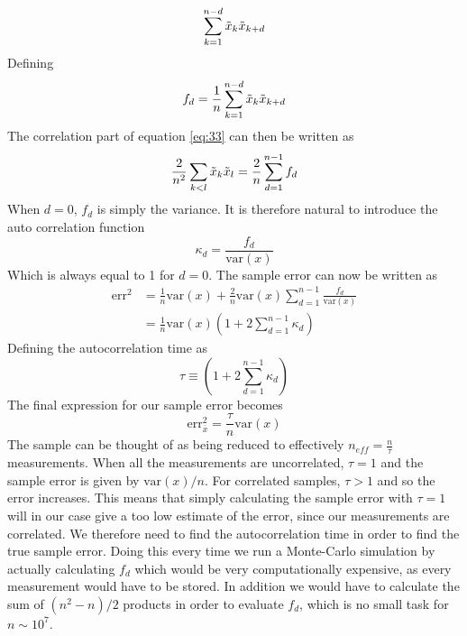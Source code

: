 \documentclass[
    a4paper, aps, twocolumn, floatfix, superscriptaddress,
    nofootinbib]{revtex4-1}
\begin{document}
\begin{equation}
     \sum_{k=1}^{n-d}\Tilde{x}_k \Tilde{x}_{k+d}
\end{equation}
Defining 
\begin{equation}
    f_d = \frac{1}{n} \sum_{k=1}^{n-d} \Tilde{x}_k \Tilde{x}_{k+d}
\end{equation}
The correlation part of equation \eqref{eq:33} can then be written as 
\begin{equation}
 \frac{2}{n^2} \sum_{k<l} \Tilde{x}_k \Tilde{x}_l = \frac{2}{n} \sum_{d=1}^{n-1} f_d   
\end{equation}
When $d=0$, $f_d$ is simply the variance. It is therefore natural to introduce the auto correlation function
\begin{equation}
\kappa_d = \frac{f_d}{\text{var}(x)}
\end{equation}
Which is always equal to 1 for $d=0$. The sample error can now be written as 
\begin{align}
    \text{err}^2 &= \frac{1}{n}\text{var}(x) + \frac{2}{n} \text{var}(x) \sum_{d=1}^{n-1} \frac{f_d}{\text{var}(x)}\\ 
    & = \frac{1}{n} \text{var}(x) \left( 1 + 2\sum_{d=1}^{n-1} \kappa_d \right) 
\end{align}
Defining the autocorrelation time as 
\begin{equation}
\tau \equiv \left( 1 + 2\sum_{d=1}^{n-1} \kappa_d \right) 
\end{equation}
The final expression for our sample error becomes 
\begin{equation}\label{eq:43}
    \text{err}_{\overline{x}}^2 = \frac{\tau}{n}\text{var}(x)
\end{equation}
The sample can be thought of as being reduced to effectively $n_{eff} = \frac{n}{\tau}$ measurements. 
When all the measurements are uncorrelated, $\tau = 1$ and the sample error is given by $\text{var}(x)/n$. For correlated samples, $\tau>1$ and so the error increases. This means that simply calculating the sample error with $\tau=1$ will in our case give a too low estimate of the error, since our measurements are correlated. We therefore need to find the autocorrelation time in order to find the true sample error. Doing this every time we run a Monte-Carlo simulation by actually calculating $f_d$ which would be very computationally expensive, as every measurement would have to be stored. In addition we would have to calculate the sum of $(n^2-n)/2$ products in order to evaluate $f_d$, which is no small task for $n \sim 10^7 $. 
\end{document}
